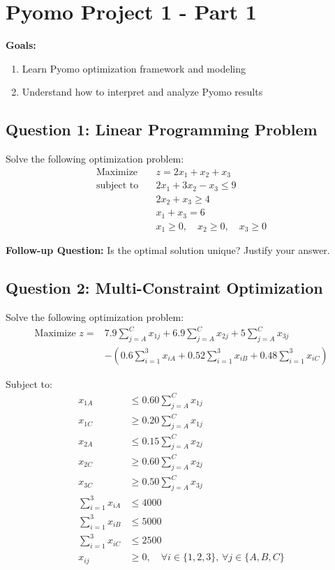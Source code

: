 \documentclass{KPS_assignment}
\begin{document}
\maketitle
\section*{Pyomo Project 1 - Part 1}

\textbf{Goals:}
\begin{enumerate}
\item Learn Pyomo optimization framework and modeling
\item Understand how to interpret and analyze Pyomo results
\end{enumerate}

\subsection*{Question 1: Linear Programming Problem}

Solve the following optimization problem:
\begin{align*}
\text{Maximize} \quad & z = 2x_1 + x_2 + x_3 \\
\text{subject to} \quad
& 2x_1 + 3x_2 - x_3 \leq 9 \\
& 2x_2 + x_3 \geq 4 \\
& x_1 + x_3 = 6 \\
& x_1 \geq 0, \quad x_2 \geq 0, \quad x_3 \geq 0
\end{align*}

\textbf{Follow-up Question:} Is the optimal solution unique? Justify your answer.


\subsection*{Question 2: Multi-Constraint Optimization}

Solve the following optimization problem:
\begin{equation*}
\begin{aligned}
\text{Maximize } z = & 7.9 \sum_{j=A}^{C} x_{1j} + 6.9 \sum_{j=A}^{C} x_{2j} + 5 \sum_{j=A}^{C} x_{3j} \\
& - \left( 0.6 \sum_{i=1}^{3} x_{iA} + 0.52 \sum_{i=1}^{3} x_{iB} + 0.48 \sum_{i=1}^{3} x_{iC} \right)
\end{aligned}
\end{equation*}

Subject to:
\begin{align*}
x_{1A} & \leq 0.60 \sum_{j=A}^{C} x_{1j} \\
x_{1C} & \geq 0.20 \sum_{j=A}^{C} x_{1j} \\
x_{2A} & \leq 0.15 \sum_{j=A}^{C} x_{2j} \\
x_{2C} & \geq 0.60 \sum_{j=A}^{C} x_{2j} \\
x_{3C} & \geq 0.50 \sum_{j=A}^{C} x_{3j} \\
\sum_{i=1}^{3} x_{iA} & \leq 4000 \\
\sum_{i=1}^{3} x_{iB} & \leq 5000 \\
\sum_{i=1}^{3} x_{iC} & \leq 2500 \\
x_{ij} & \geq 0, \quad \forall i \in \{1,2,3\}, \, \forall j \in \{A,B,C\}
\end{align*}
\end{document}
